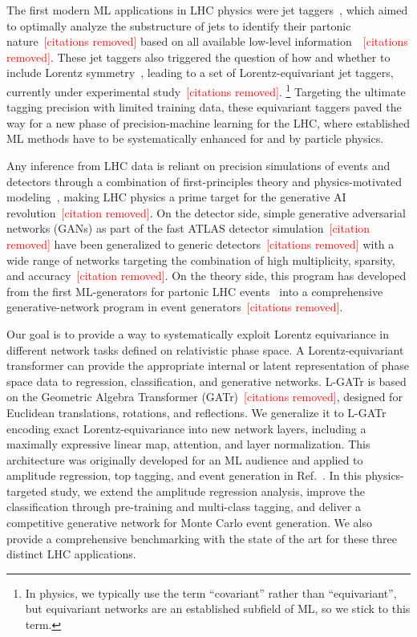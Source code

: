 \documentclass[submission, Phys]{SciPost}
\begin{document}
The first modern ML applications in LHC physics were jet taggers~\cite{Kasieczka:2019dbj,Nachman:2022emq}, which aimed to optimally analyze the substructure of jets to identify their partonic nature\textcolor{red}{~[citations removed]} based on all available low-level information~\cite{deOliveira:2015xxd,Kasieczka:2017nvn}\textcolor{red}{~[citations removed]}.
%
These jet taggers also triggered the question of how and whether to include Lorentz symmetry~\cite{Butter:2017cot}, leading to a set of Lorentz-equivariant jet taggers, currently under experimental study\textcolor{red}{~[citations removed]}.%
%
\footnote{In physics, we typically use the term ``covariant'' rather than ``equivariant'', but equivariant networks are an established subfield of ML, so we stick to this term.}
%
Targeting the ultimate tagging precision with limited training data, these equivariant taggers paved the way for a new phase of precision-machine learning for the LHC, where established ML methods have to be systematically enhanced for and by particle physics.

Any inference from LHC data is reliant on precision simulations of events and detectors through a combination of first-principles theory and physics-motivated modeling~\cite{Butter:2022rso,Campbell:2022qmc}, making LHC physics a prime target for the generative AI revolution\textcolor{red}{~[citation removed]}. On the detector side, simple generative adversarial networks (GANs) as part of the fast ATLAS detector simulation\textcolor{red}{~[citation removed]} have been generalized to generic detectors\textcolor{red}{~[citations removed]} with a wide range of networks targeting the combination of high multiplicity, sparsity, and accuracy\textcolor{red}{~[citation removed]}.
On the theory side, this program has developed from the first ML-generators for partonic LHC events~\cite{Otten:2019hhl,Hashemi:2019fkn,Butter:2019cae} into a comprehensive generative-network program in event generators\textcolor{red}{~[citations removed]}.

Our goal is to provide a way to systematically exploit Lorentz equivariance in different network tasks defined on relativistic phase space. A Lorentz-equivariant transformer can provide the appropriate internal or latent representation of phase space data to regression, classification, and generative networks. L-GATr is based on the Geometric Algebra Transformer (GATr)\textcolor{red}{~[citations removed]}, designed for Euclidean translations, rotations, and reflections. We generalize it to L-GATr encoding exact Lorentz-equivariance into new network layers, including a maximally expressive linear map, attention, and layer normalization. This architecture was originally developed for an ML audience and applied to amplitude regression, top tagging, and event generation in Ref.~\cite{Spinner:2024hjm}. In this physics-targeted study, we extend the amplitude regression analysis, improve the classification through pre-training and multi-class tagging, and deliver a competitive generative network for Monte Carlo event generation. We also provide a comprehensive benchmarking with the state of the art for these three distinct LHC applications.
\end{document}
